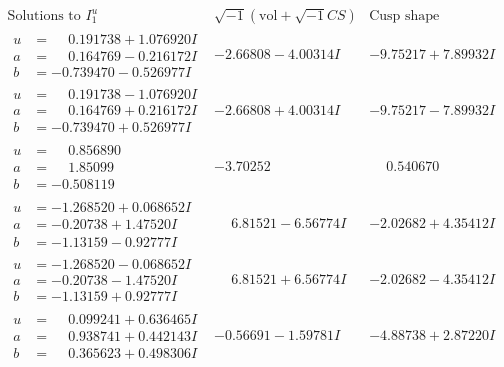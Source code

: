 \documentclass[1p]{elsarticle_modified}
\theoremstyle{definition}
\newcommand{\I}{\sqrt{-1}}
\begin{document}
$$\begin{array}{c|c|c}  
\text{Solutions to }I^u_{1}& \I (\text{vol} + \sqrt{-1}CS) & \text{Cusp shape}\\
 \hline 
\begin{aligned}
u &= \phantom{-}0.191738 + 1.076920 I \\
a &= \phantom{-}0.164769 - 0.216172 I \\
b &= -0.739470 - 0.526977 I\end{aligned}
 & -2.66808 - 4.00314 I & -9.75217 + 7.89932 I \\ \hline\begin{aligned}
u &= \phantom{-}0.191738 - 1.076920 I \\
a &= \phantom{-}0.164769 + 0.216172 I \\
b &= -0.739470 + 0.526977 I\end{aligned}
 & -2.66808 + 4.00314 I & -9.75217 - 7.89932 I \\ \hline\begin{aligned}
u &= \phantom{-}0.856890\phantom{ +0.000000I} \\
a &= \phantom{-}1.85099\phantom{ +0.000000I} \\
b &= -0.508119\phantom{ +0.000000I}\end{aligned}
 & -3.70252\phantom{ +0.000000I} & \phantom{-}0.540670\phantom{ +0.000000I} \\ \hline\begin{aligned}
u &= -1.268520 + 0.068652 I \\
a &= -0.20738 + 1.47520 I \\
b &= -1.13159 - 0.92777 I\end{aligned}
 & \phantom{-}6.81521 - 6.56774 I & -2.02682 + 4.35412 I \\ \hline\begin{aligned}
u &= -1.268520 - 0.068652 I \\
a &= -0.20738 - 1.47520 I \\
b &= -1.13159 + 0.92777 I\end{aligned}
 & \phantom{-}6.81521 + 6.56774 I & -2.02682 - 4.35412 I \\ \hline\begin{aligned}
u &= \phantom{-}0.099241 + 0.636465 I \\
a &= \phantom{-}0.938741 + 0.442143 I \\
b &= \phantom{-}0.365623 + 0.498306 I\end{aligned}
 & -0.56691 - 1.59781 I & -4.88738 + 2.87220 I \\ \hline\begin{aligned}

\end{aligned}
\end{array}$$
\end{document}
